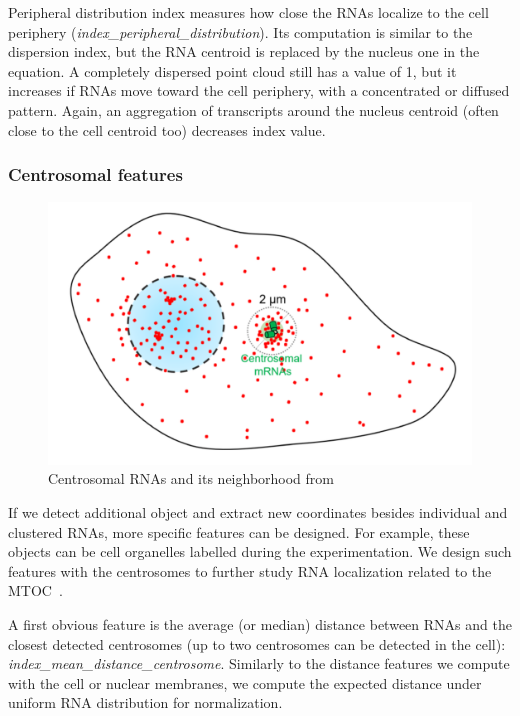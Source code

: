 Peripheral distribution index measures how close the \ac{RNA}s localize to the cell periphery (\emph{index\_peripheral\_distribution}).
Its computation is similar to the dispersion index, but the \ac{RNA} centroid is replaced by the nucleus one in the equation.
A completely dispersed point cloud still has a value of 1, but it increases if \ac{RNA}s move toward the cell periphery, with a concentrated or diffused pattern.
Again, an aggregation of transcripts around the nucleus centroid (often close to the cell centroid too) decreases index value.

\subsubsection{Centrosomal features}

\begin{figure}
	\begin{center}
	\includegraphics[width=\linewidth]{figures/chapter4/centrosomal_features}
	\caption{Centrosomal RNAs and its neighborhood from~\cite{safieddine_choreography_2021}}
	\label{fig:centrosome_features}
	\end{center}
\end{figure}

If we detect additional object and extract new coordinates besides individual and clustered \ac{RNA}s, more specific features can be designed.
For example, these objects can be cell organelles labelled during the experimentation.
We design such features with the centrosomes to further study \ac{RNA} localization related to the \ac{MTOC}~\cite{safieddine_choreography_2021}.

A first obvious feature is the average (or median) distance between \ac{RNA}s and the closest detected centrosomes (up to two centrosomes can be detected in the cell): \emph{index\_mean\_distance\_centrosome}.
Similarly to the distance features we compute with the cell or nuclear membranes, we compute the expected distance under uniform \ac{RNA} distribution for normalization.

